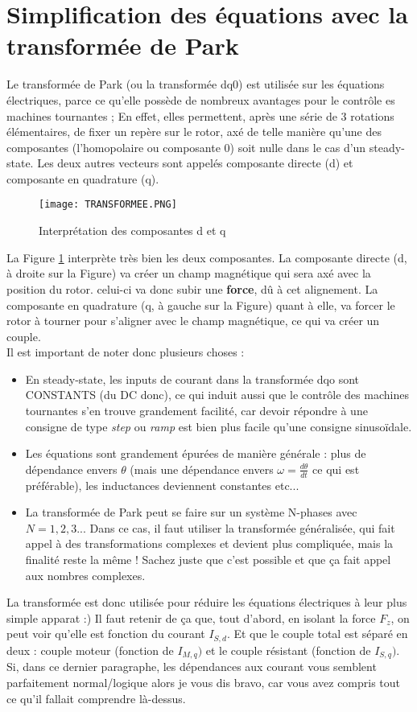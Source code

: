 \section{Simplification des équations avec la transformée de Park}
Le transformée de Park (ou la transformée dq0) est utilisée sur les équations électriques, parce ce qu'elle possède de nombreux avantages pour le contrôle es machines tournantes ; En effet, elles permettent, après une série de 3 rotations élémentaires, de fixer un repère sur le rotor, axé de telle manière qu'une des composantes (l'homopolaire ou composante 0) soit nulle dans le cas d'un steady-state. Les deux autres vecteurs sont appelés composante directe (d) et composante en quadrature (q).
\begin{figure}
    \centering
    \texttt{[image: TRANSFORMEE.PNG]}
    \caption{Interprétation des composantes d et q}
    \label{fig:dqo}
\end{figure}
La Figure \ref{fig:dqo} interprète très bien les deux composantes. La composante directe (d, à droite sur la Figure) va créer un champ magnétique qui sera axé avec la position du rotor. celui-ci va donc subir une \textbf{force}, dû à cet alignement. La composante en quadrature (q, à gauche sur la Figure) quant à elle, va forcer le rotor à tourner pour s'aligner avec le champ magnétique, ce qui va créer un couple.\\
Il est important de noter donc plusieurs choses : 
\begin{itemize}
    \item En steady-state, les inputs de courant dans la transformée dqo sont CONSTANTS (du DC donc), ce qui induit aussi que le contrôle des machines tournantes s'en trouve grandement facilité, car devoir répondre à une consigne de type \textit{step} ou \textit{ramp} est bien plus facile qu'une consigne sinusoïdale.
    \item Les équations sont grandement épurées de manière générale : plus de dépendance envers $\theta$ (mais une dépendance envers $\omega = \frac{d\theta}{dt}$ ce qui est préférable), les inductances deviennent constantes etc...
    \item La transformée de Park peut se faire sur un système N-phases avec $N=1,2,3...$ Dans ce cas, il faut utiliser la transformée généralisée, qui fait appel à des transformations complexes et devient plus compliquée, mais la finalité reste la même ! Sachez juste que c'est possible et que ça fait appel aux nombres complexes.
\end{itemize}
La transformée est donc utilisée pour réduire les équations électriques à leur plus simple apparat :) Il faut retenir de ça que, tout d'abord, en isolant la force $F_z$, on peut voir qu'elle est fonction du courant $I_{S,d}$. Et que le couple total est séparé en deux : couple moteur (fonction de $I_{M,q})$ et le couple résistant (fonction de $I_{S,q})$.\\
Si, dans ce dernier paragraphe, les dépendances aux courant vous semblent parfaitement normal/logique alors je vous dis bravo, car vous avez compris tout ce qu'il fallait comprendre là-dessus.

